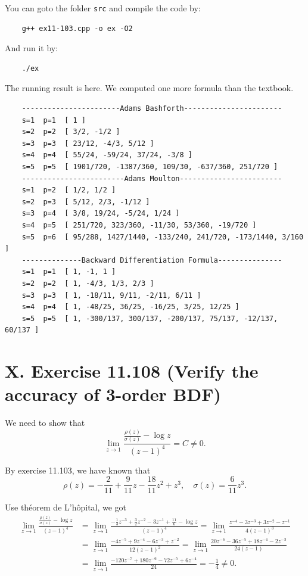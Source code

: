 \documentclass[twoside,a4paper]{article}
\begin{document}
You can goto the folder \verb|src| and compile the code by:
\begin{lstlisting}
    g++ ex11-103.cpp -o ex -O2
\end{lstlisting}

And run it by:
\begin{lstlisting}
    ./ex
\end{lstlisting}

The running result is here. We computed one more formula than the textbook.

\begin{lstlisting}
    -----------------------Adams Bashforth-----------------------
    s=1  p=1  [ 1 ]
    s=2  p=2  [ 3/2, -1/2 ]
    s=3  p=3  [ 23/12, -4/3, 5/12 ]
    s=4  p=4  [ 55/24, -59/24, 37/24, -3/8 ]
    s=5  p=5  [ 1901/720, -1387/360, 109/30, -637/360, 251/720 ]
    ------------------------Adams Moulton------------------------
    s=1  p=2  [ 1/2, 1/2 ]
    s=2  p=3  [ 5/12, 2/3, -1/12 ]
    s=3  p=4  [ 3/8, 19/24, -5/24, 1/24 ]
    s=4  p=5  [ 251/720, 323/360, -11/30, 53/360, -19/720 ]
    s=5  p=6  [ 95/288, 1427/1440, -133/240, 241/720, -173/1440, 3/160 ]
    --------------Backward Differentiation Formula---------------
    s=1  p=1  [ 1, -1, 1 ]
    s=2  p=2  [ 1, -4/3, 1/3, 2/3 ]
    s=3  p=3  [ 1, -18/11, 9/11, -2/11, 6/11 ]
    s=4  p=4  [ 1, -48/25, 36/25, -16/25, 3/25, 12/25 ]
    s=5  p=5  [ 1, -300/137, 300/137, -200/137, 75/137, -12/137, 60/137 ]    
\end{lstlisting}

\section*{X. Exercise 11.108 (Verify the accuracy of 3-order BDF)}

\;\;\;\; We need to show that
\begin{equation*}
    \lim_{z\to 1} \frac{\frac{\rho(z)}{\sigma(z)}-\log z}{(z-1)^4}=C\neq 0.
\end{equation*}

By exercise 11.103, we have known that
\begin{equation*}
    \rho(z)=-\frac{2}{11}+\frac{9}{11}z-\frac{18}{11}z^2+z^3,\quad \sigma(z)=\frac{6}{11}z^3.
\end{equation*}

Use th\'eorem de L'h\^opital, we got
\begin{align*}
    \lim_{z\to 1} \frac{\frac{\rho(z)}{\sigma(z)}-\log z}{(z-1)^4} &= \lim_{z\to 1} \frac{-\frac{1}{3}z^{-3}+\frac{3}{2}z^{-2}-3z^{-1}+\frac{11}{6}-\log z}{(z-1)^4}= \lim_{z\to 1}\frac{z^{-4}-3z^{-3}+3z^{-2}-z^{-1}}{4(z-1)^3}\\
    &= \lim_{z\to 1}\frac{-4z^{-5}+9z^{-4}-6z^{-3}+z^{-2}}{12(z-1)^2} = \lim_{z\to 1}\frac{20z^{-6}-36z^{-5}+18z^{-4}-2z^{-3}}{24(z-1)}\\
    &=\lim_{z\to 1}\frac{-120z^{-7}+180z^{-6}-72z^{-5}+6z^{-4}}{24}=-\frac{1}{4}\neq 0.
\end{align*}
\end{document}
